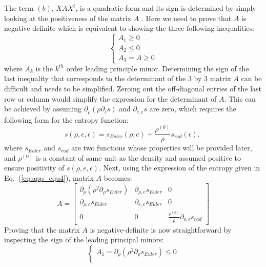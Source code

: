 \documentclass[review]{elsarticle}
\newcommand{\eqt}[1]{Eq.~(\ref{#1})}                     %
\begin{document}
\begin{appendices}
The term $(b)$, $XAX^t$, is a quadratic form and its sign is determined by simply looking at the positiveness of the matrix $A$ \cite{Evans}. Here we need to prove that $A$ is negative-definite which is equivalent to showing the three following inequalities:
\begin{equation}
 \left\{
 \begin{array}{ccc}
 A_1 \geq 0 \\
 A_2 \leq 0 \\
 A_3 = A \geq 0
 \end{array}
 \right.
 \end{equation}
 where $A_k$ is the $k^{th}$ order leading principle minor. Determining the sign of the last inequality that corresponds to the determinant of the $3$ by $3$ matrix $A$ can be difficult and needs to be simplified. Zeroing out the off-diagonal entries of the last row or column would simplify the expression for the determinant of $A$. This can be achieved by assuming $\partial_{\rho}(\rho \partial_{\epsilon} s)$ and $\partial_{e, \epsilon} s$ are zero, which requires the following form for the entropy function:
\begin{equation}
\label{eq:app_equ4}
s(\rho, e, \epsilon) = s_{Euler}(\rho,e) + \frac{\rho^{(0)}}{\rho}s_{rad}(\epsilon) \text{. } 
\end{equation}
where $s_{Euler}$ and $s_{rad}$ are two functions whose properties will be provided later, and $\rho^{(0)}$ is a constant of same unit as the density and assumed positive to ensure positivity of $s(\rho,e,\epsilon)$.
Next, using the expression of the entropy given in \eqt{eq:app_equ4}, matrix $A$ becomes:
 \begin{equation}
 A = 
 \left[
 \begin{array}{ccc}
\partial_{\rho} \left( \rho^2 \partial_{\rho} s_{Euler} \right) & \partial_{\rho,e} s_{Euler} & 0 \\
 \partial_{\rho,e} s_{Euler} & \partial_{e,e} s_{Euler} & 0 \\
 0 & 0 & \frac{\rho^{(0)}}{\rho} \partial_{\epsilon,\epsilon} s_{rad}
 \end{array}
 \right] \nonumber
 \end{equation}
 Proving that the matrix $A$ is  negative-definite is now straightforward by inspecting the sign of the leading principal minors:
 \begin{equation}
 \label{eq:A_matrix}
 \left\{
 \begin{array}{lll}
 A_1 = \partial_{\rho} \left( \rho^2 \partial_{\rho} s_{Euler} \right) \leq 0 \\

\end{array}
\end{equation}
\end{appendices}
\end{document}
